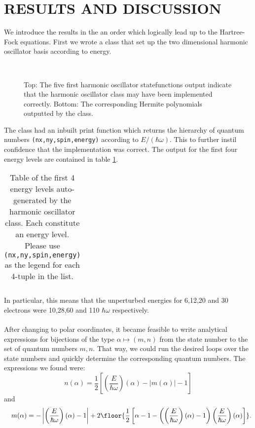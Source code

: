 \documentclass[11pt,english,a4paper]{article}
\begin{document}
\section*{\uppercase{Results and discussion}}
We introduce the results in the an order which logically lead up to the Hartree-Fock equations. First we wrote a class that set up the two dimensional harmonic oscillator basis according to energy. 
\begin{figure}
\center
\\

\caption{Top: The five first harmonic oscillator statefunctions output indicate that the harmonic oscillator class may have been implemented correctly. Bottom: The corresponding Hermite polynomials outputted by the class.} \label{fig:exp}
\end{figure}
The class had an inbuilt print function which returns the hierarchy of quantum numbers \texttt{(nx,ny,spin,energy)} according to $E/(\hbar \omega)$. This to further instil confidence that the implementation was correct. The output for the first four energy levels are contained in table \ref{tbl:states}.
\begin{table}[!h]
\begin{center}
\begin{tabular}{c}

\end{tabular}
\caption{Table of the first 4 energy levels auto-generated by the harmonic oscillator class. Each constitute an energy level. Please use \texttt{(nx,ny,spin,energy)} as the legend for each 4-tuple in the list.}\label{tbl:states}
\end{center}
\end{table}
In particular, this means that the unperturbed energies for 6,12,20 and 30 electrons were 10,28,60 and 110 $\hbar \omega$ respectively. \\
\\
After changing to polar coordinates, it became feasible to write analytical expressions for bijections of the type $\alpha \mapsto (m,n)$ from the state number to the set of quantum numbers $m,n$. That way, we could run the desired loops over the state numbers and quickly determine the corresponding quantum numbers. The expressions we found were:
\[
n(\alpha) = \frac{1}{2} \left[ \left(\frac{E}{\hbar \omega} \right)(\alpha) - |m(\alpha)| - 1 \right]\]
and
\[ \quad m(\alpha) = - \left| \left(\frac{E}{\hbar \omega} \right)(\alpha) - 1 \right| + 2 \floor{ \frac{1}{2}\left[\alpha - 1 - \left( \left(\frac{E}{\hbar \omega} \right)(\alpha) - 1 \right)\left(\frac{E}{\hbar \omega} \right)(\alpha) \right] }.
\]
\end{document}
